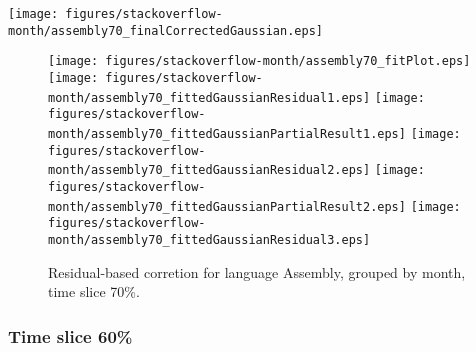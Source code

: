 \begin{center}
{\texttt{[image: figures/stackoverflow-month/assembly70\_finalCorrectedGaussian.eps]}}
\end{center}

\FloatBarrier

\begin{figure}[t]
\centering
{}
{\texttt{[image: figures/stackoverflow-month/assembly70\_fitPlot.eps]}}
{\texttt{[image: figures/stackoverflow-month/assembly70\_fittedGaussianResidual1.eps]}}
{\texttt{[image: figures/stackoverflow-month/assembly70\_fittedGaussianPartialResult1.eps]}}
{\texttt{[image: figures/stackoverflow-month/assembly70\_fittedGaussianResidual2.eps]}}
{\texttt{[image: figures/stackoverflow-month/assembly70\_fittedGaussianPartialResult2.eps]}}
{\texttt{[image: figures/stackoverflow-month/assembly70\_fittedGaussianResidual3.eps]}}
\caption{Residual-based corretion for language Assembly, grouped by month, time slice 70\%.}
\end{figure}


\FloatBarrier


\subsubsection{Time slice 60\%}

